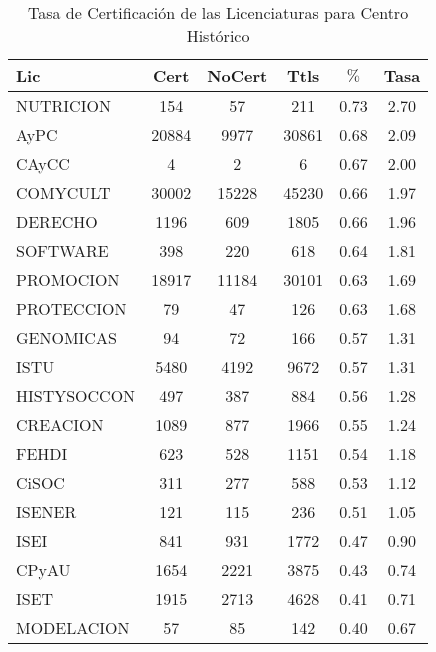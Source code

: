 \documentclass{article}
\begin{document}
\begin{table}[h]
\centering
\begin{tabular}{|l|cc|c|cc|}\hline\hline
Lic & Cert & NoCert & Ttls & $\%$ & Tasa \\\hline\hline
NUTRICION & 154 & 57 & 211 & 0.73 & 2.70 \\
AyPC & 20884 & 9977 & 30861 & 0.68 & 2.09 \\
CAyCC & 4 & 2 & 6 & 0.67 & 2.00 \\\hline\hline
COMYCULT & 30002 & 15228 & 45230 & 0.66 & 1.97 \\
DERECHO & 1196 & 609 & 1805 & 0.66 & 1.96 \\
SOFTWARE & 398 & 220 & 618 & 0.64 & 1.81 \\
PROMOCION & 18917 & 11184 & 30101 & 0.63 & 1.69 \\
PROTECCION & 79 & 47 & 126 & 0.63 & 1.68 \\\hline\hline
GENOMICAS & 94 & 72 & 166 & 0.57 & 1.31 \\
ISTU & 5480 & 4192 & 9672 & 0.57 & 1.31 \\
HISTYSOCCON & 497 & 387 & 884 & 0.56 & 1.28 \\
CREACION & 1089 & 877 & 1966 & 0.55 & 1.24 \\
FEHDI & 623 & 528 & 1151 & 0.54 & 1.18 \\
CiSOC & 311 & 277 & 588 & 0.53 & 1.12 \\
ISENER & 121 & 115 & 236 & 0.51 & 1.05 \\\hline\hline
ISEI & 841 & 931 & 1772 & 0.47 & 0.90 \\
CPyAU & 1654 & 2221 & 3875 & 0.43 & 0.74 \\
ISET & 1915 & 2713 & 4628 & 0.41 & 0.71 \\
MODELACION & 57 & 85 & 142 & 0.40 & 0.67 \\\hline\hline
\end{tabular}
\caption{Tasa de Certificación de las Licenciaturas para Centro Histórico}
\end{table}
\end{document}
